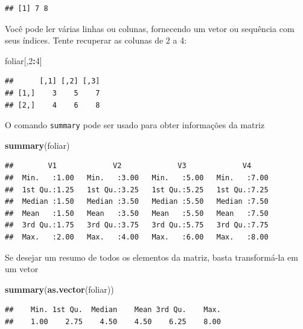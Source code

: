 \documentclass[]{book}
\newenvironment{Shaded}{\begin{snugshade}}{\end{snugshade}}
\newcommand{\DecValTok}[1]{\textcolor[rgb]{0.00,0.00,0.81}{#1}}
\newcommand{\KeywordTok}[1]{\textcolor[rgb]{0.13,0.29,0.53}{\textbf{#1}}}
\newcommand{\NormalTok}[1]{#1}
\newcommand{\OperatorTok}[1]{\textcolor[rgb]{0.81,0.36,0.00}{\textbf{#1}}}
\begin{document}
\begin{verbatim}
## [1] 7 8
\end{verbatim}

Você pode ler várias linhas ou colunas, fornecendo um vetor ou sequência com seus índices. Tente recuperar as colunas de 2 a 4:

\begin{Shaded}
\begin{Highlighting}[]
\NormalTok{foliar[,}\DecValTok{2}\OperatorTok{:}\DecValTok{4}\NormalTok{]}
\end{Highlighting}
\end{Shaded}

\begin{verbatim}
##      [,1] [,2] [,3]
## [1,]    3    5    7
## [2,]    4    6    8
\end{verbatim}

O comando \texttt{summary} pode ser usado para obter informações da matriz

\begin{Shaded}
\begin{Highlighting}[]
\KeywordTok{summary}\NormalTok{(foliar)}
\end{Highlighting}
\end{Shaded}

\begin{verbatim}
##        V1             V2             V3             V4      
##  Min.   :1.00   Min.   :3.00   Min.   :5.00   Min.   :7.00  
##  1st Qu.:1.25   1st Qu.:3.25   1st Qu.:5.25   1st Qu.:7.25  
##  Median :1.50   Median :3.50   Median :5.50   Median :7.50  
##  Mean   :1.50   Mean   :3.50   Mean   :5.50   Mean   :7.50  
##  3rd Qu.:1.75   3rd Qu.:3.75   3rd Qu.:5.75   3rd Qu.:7.75  
##  Max.   :2.00   Max.   :4.00   Max.   :6.00   Max.   :8.00
\end{verbatim}

Se desejar um resumo de todos os elementos da matriz, basta transformá-la em um vetor

\begin{Shaded}
\begin{Highlighting}[]
\KeywordTok{summary}\NormalTok{(}\KeywordTok{as.vector}\NormalTok{(foliar))}
\end{Highlighting}
\end{Shaded}

\begin{verbatim}
##    Min. 1st Qu.  Median    Mean 3rd Qu.    Max. 
##    1.00    2.75    4.50    4.50    6.25    8.00
\end{verbatim}
\end{document}
